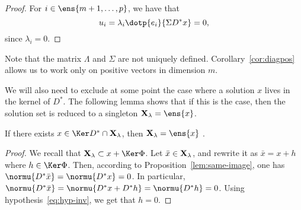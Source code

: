 \begin{proof}
  For $i \in \ens{m+1,\dots,p}$, we have that
  \begin{equation*}
    u_i = \lambda_i \dotp{e_i}{\Sigma D^* x} = 0,
  \end{equation*}
  since $\lambda_i = 0$.
\end{proof}
Note that the matrix $\Lambda$ and $\Sigma$ are not uniquely defined. Corollary~\ref{cor:diagpos} allows us to work only on positive vectors in dimension $m$.

We will also need to exclude at some point the case where a solution $x$ lives in the kernel of $D^*$.
The following lemma shows that if this is the case, then the solution set is reduced to a singleton $\Xl = \ens{x}$.
\begin{lemma}\label{lem:kernel-one-image}
  If there exists $x \in \Ker D^* \cap \Xl$, then $\Xl = \ens{x}$ .
\end{lemma}
\begin{proof}
  We recall that $\Xl \subset x + \Ker \Phi$.
  Let $\bar x \in \mathbf{X}_{\lambda}$, and rewrite it as $\bar x = x + h$ where $h \in \Ker \Phi$.
  Then, according to Proposition~\ref{lem:same-image}, one has $\normu{D^* \bar x} = \normu{D^* x} = 0$.
  In particular, $\normu{D^* \bar x} = \normu{D^* x + D^* h} =  \normu{D^* h} = 0$.
  Using hypothesis~\eqref{eq:hyp-inv}, we get that $h = 0$.
\end{proof}

